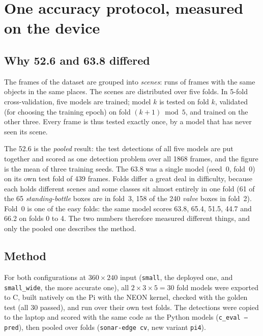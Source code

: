 \documentclass[11pt,a4paper]{article}
\newcommand{\cfg}[1]{\texttt{#1}}
\begin{document}
\tableofcontents

\section{One accuracy protocol, measured on the device}
\label{sec:protocol}

\subsection{Why 52.6 and 63.8 differed}

The frames of the dataset are grouped into \emph{scenes}: runs of frames
with the same objects in the same places. The scenes are distributed over
five folds. In 5-fold cross-validation, five models are trained; model $k$
is tested on fold $k$, validated (for choosing the training epoch) on fold
$(k+1) \bmod 5$, and trained on the other three. Every frame is thus tested
exactly once, by a model that has never seen its scene.

The 52.6 is the \emph{pooled} result: the test detections of all five models
are put together and scored as one detection problem over all \num{1868}
frames, and the figure is the mean of three training seeds. The 63.8 was a
single model (seed~0, fold~0) on its own test fold of 439 frames. Folds
differ a great deal in difficulty, because each holds different scenes and
some classes sit almost entirely in one fold (61 of the 65
\emph{standing-bottle} boxes are in fold~3, 158 of the 240 \emph{valve}
boxes in fold~2). Fold~0 is one of the easy folds: the same model scores
63.8, 65.4, 51.5, 44.7 and 66.2 on folds 0 to 4. The two numbers therefore
measured different things, and only the pooled one describes the method.

\subsection{Method}

For both configurations at $360 \times 240$ input (\cfg{small}, the
deployed one, and \cfg{small\_wide}, the more accurate one), all
$2 \times 3 \times 5 = 30$ fold models were exported to C, built natively
on the Pi with the NEON kernel, checked with the golden test (all 30
passed), and run over their own test folds. The detections were copied to
the laptop and scored with the same code as the Python models
(\texttt{c\_eval --pred}), then pooled over folds (\texttt{sonar-edge cv},
new variant \texttt{pi4}).
\end{document}
